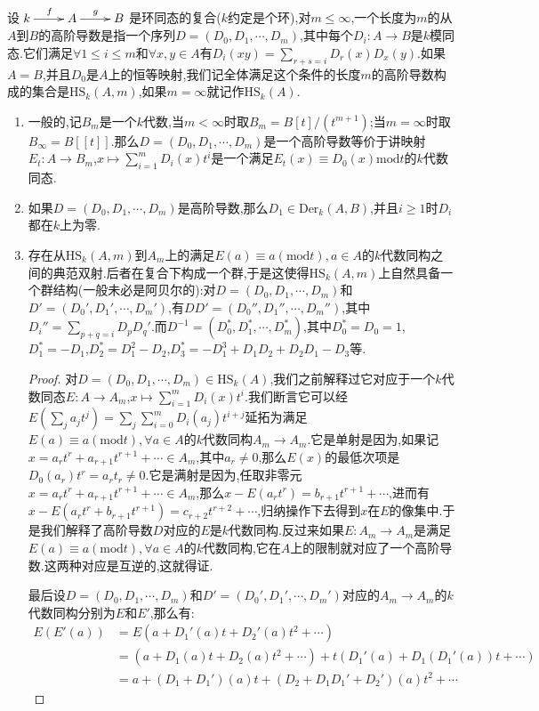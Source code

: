设$\xymatrix{k\ar[r]^f&A\ar[r]^g&B}$是环同态的复合($k$约定是个环),对$m\le\infty$,一个长度为$m$的从$A$到$B$的高阶导数是指一个序列$D=(D_0,D_1,\cdots,D_m)$,其中每个$D_i:A\to B$是$k$模同态.它们满足$\forall 1\le i\le m$和$\forall x,y\in A$有$D_i(xy)=\sum_{r+s=i}D_r(x)D_x(y)$.如果$A=B$,并且$D_0$是$A$上的恒等映射,我们记全体满足这个条件的长度$m$的高阶导数构成的集合是$\mathrm{HS}_k(A,m)$,如果$m=\infty$就记作$\mathrm{HS}_k(A)$.
\begin{enumerate}
	\item 一般的,记$B_m$是一个$k$代数,当$m<\infty$时取$B_m=B[t]/(t^{m+1})$;当$m=\infty$时取$B_{\infty}=B[[t]]$.那么$D=(D_0,D_1,\cdots,D_m)$是一个高阶导数等价于讲映射$E_t:A\to B_m$,$x\mapsto\sum_{i=1}^mD_i(x)t^i$是一个满足$E_t(x)\equiv D_0(x)\mathrm{mod}t$的$k$代数同态.
	\item 如果$D=(D_0,D_1,\cdots,D_m)$是高阶导数,那么$D_1\in\mathrm{Der}_k(A,B)$,并且$i\ge1$时$D_i$都在$k$上为零.
	\item 存在从$\mathrm{HS}_k(A,m)$到$A_m$上的满足$E(a)\equiv a(\mathrm{mod}t),a\in A$的$k$代数同构之间的典范双射.后者在复合下构成一个群,于是这使得$\mathrm{HS}_k(A,m)$上自然具备一个群结构(一般未必是阿贝尔的):对$D=(D_0,D_1,\cdots,D_m)$和$D'=(D_0',D_1',\cdots,D_m')$,有$DD'=(D_0'',D_1'',\cdots,D_m'')$,其中$D_i''=\sum_{p+q=i}D_pD_q'$.而$D^{-1}=(D_0^*,D_1^*,\cdots,D_m^*)$,其中$D_0^*=D_0=1$,$D_1^*=-D_1$,$D_2^*=D_1^2-D_2$,$D_3^*=-D_1^3+D_1D_2+D_2D_1-D_3$等.
	\begin{proof}
		
		对$D=(D_0,D_1,\cdots,D_m)\in\mathrm{HS}_k(A)$,我们之前解释过它对应于一个$k$代数同态$E:A\to A_m$,$x\mapsto\sum_{i=1}^mD_i(x)t^i$.我们断言它可以经$E(\sum_ja_jt^j)=\sum_j\sum_{i=0}^mD_i(a_j)t^{i+j}$延拓为满足$E(a)\equiv a(\mathrm{mod}t),\forall a\in A$的$k$代数同构$A_m\to A_m$.它是单射是因为,如果记$x=a_rt^r+a_{r+1}t^{r+1}+\cdots\in A_m$,其中$a_r\not=0$,那么$E(x)$的最低次项是$D_0(a_r)t^r=a_rt_r\not=0$.它是满射是因为,任取非零元$x=a_rt^r+a_{r+1}t^{r+1}+\cdots\in A_m$,那么$x-E(a_rt^r)=b_{r+1}t^{r+1}+\cdots$,进而有$x-E(a_rt^r+b_{r+1}t^{r+1})=c_{r+2}t^{r+2}+\cdots$,归纳操作下去得到$x$在$E$的像集中.于是我们解释了高阶导数$D$对应的$E$是$k$代数同构.反过来如果$E:A_m\to A_m$是满足$E(a)\equiv a(\mathrm{mod}t),\forall a\in A$的$k$代数同构,它在$A$上的限制就对应了一个高阶导数.这两种对应是互逆的,这就得证.
		
		\qquad
		
		最后设$D=(D_0,D_1,\cdots,D_m)$和$D'=(D_0',D_1',\cdots,D_m')$对应的$A_m\to A_m$的$k$代数同构分别为$E$和$E'$,那么有:
		\begin{align*}
			E(E'(a))&=E(a+D_1'(a)t+D_2'(a)t^2+\cdots)\\&=(a+D_1(a)t+D_2(a)t^2+\cdots)+t(D_1'(a)+D_1(D_1'(a))t+\cdots)\\&=a+(D_1+D_1')(a)t+(D_2+D_1D_1'+D_2')(a)t^2+\cdots
		\end{align*}
	

\end{proof}
\end{enumerate}
